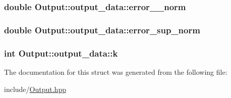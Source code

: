 \hypertarget{structOutput_1_1output__data_a5fe831e4e8f63c2e80288fa44a4df464}{
\subsubsection[{error\-\_\-2\-\_\-norm}]{\setlength{\rightskip}{0pt plus 5cm}double Output\-::output\-\_\-data\-::error\-\_\-\_\-norm}}\label{structOutput_1_1output__data_a5fe831e4e8f63c2e80288fa44a4df464}
\hypertarget{structOutput_1_1output__data_a1a857f7f9a97056761e57592c1c61d6c}{
\subsubsection[{error\-\_\-sup\-\_\-norm}]{\setlength{\rightskip}{0pt plus 5cm}double Output\-::output\-\_\-data\-::error\-\_\-sup\-\_\-norm}}\label{structOutput_1_1output__data_a1a857f7f9a97056761e57592c1c61d6c}
\hypertarget{structOutput_1_1output__data_a542d1b4fb07ccca6aa777459e7d6d44c}{
\subsubsection[{k}]{\setlength{\rightskip}{0pt plus 5cm}int Output\-::output\-\_\-data\-::k}}\label{structOutput_1_1output__data_a542d1b4fb07ccca6aa777459e7d6d44c}


The documentation for this struct was generated from the following file\-:\begin{DoxyCompactItemize}
\item 
include/\hyperlink{Output_8hpp}{Output.\-hpp}\end{DoxyCompactItemize}
